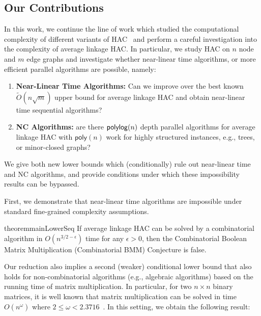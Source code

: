 \documentclass[11pt]{article}
\newcommand{\NC}{\textsc{NC}\xspace}
\newcommand{\poly}{\ensuremath{\mathsf{poly}}}
\newcommand{\polylog}{{\ensuremath\mathsf{polylog}}}
\begin{document}
\subsection{Our Contributions}
In this work, we continue the line of work which studied the computational complexity of different variants of HAC~\cite{greenlaw2008parallel, tsenghac, abboudhac, dhulipala2021hierarchical, dhulipala2022hierarchical} and perform a careful investigation into the complexity of average linkage HAC.
In particular, we study HAC on $n$ node and $m$ edge graphs and investigate whether
near-linear time algorithms, or more efficient parallel algorithms are possible, namely:
\begin{enumerate}
    \item \textbf{Near-Linear Time Algorithms:} Can we improve over the best known $\tilde{O}(n\sqrt{m})$ upper bound for average linkage HAC and obtain near-linear time sequential algorithms?
    
    \item \textbf{\NC Algorithms:} are there $\polylog(n)$ depth parallel algorithms for average linkage HAC with $\poly(n)$ work for highly structured instances, e.g., trees, or minor-closed graphs?
\end{enumerate}
We give both new lower bounds which (conditionally) rule out near-linear time and \NC algorithms, and provide conditions under which these impossibility results can be bypassed.

First, we demonstrate that near-linear time algorithms are impossible under standard fine-grained complexity assumptions. 
\begin{restatable}{theorem}{mainLowerSeq}\label{thm:worklb}
    If average linkage HAC can be solved by a combinatorial algorithm in $O(n^{3/2-\epsilon})$ time for any $\epsilon > 0$, then the Combinatorial Boolean Matrix Multiplication (Combinatorial BMM) Conjecture is false.
\end{restatable}

Our reduction also implies a second (weaker) conditional lower bound that also holds for non-combinatorial algorithms (e.g., algebraic algorithms) based on the running time of matrix multiplication. 
In particular, for two $n \times n$ binary matrices, it is well known that matrix multiplication can be solved in time $O(n^{\omega})$ where $2 \leq \omega < 2.3716$~\cite{williams2024new}.
In this setting, we obtain the following result:
\end{document}

